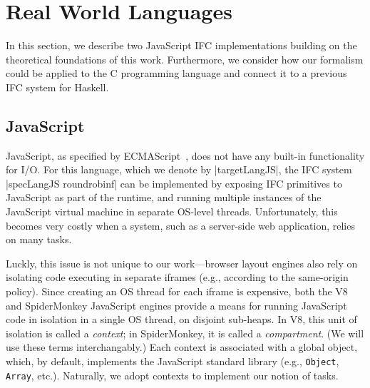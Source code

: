 \section{Real World Languages}
\label{sec:real}

In this section, we describe two JavaScript IFC implementations
building on the theoretical foundations of this work.
%
Furthermore, we consider how our formalism could be applied to the C
programming language
and connect it to a previous IFC system for
Haskell.
%
%


\subsection{JavaScript}
\label{sec:real:js}

JavaScript, as specified by
ECMAScript~\cite{ecma}, does not have any built-in
functionality for I/O.
%
For this language, which we denote by |targetLangJS|, the IFC system
|specLangJS roundrobinf| can be implemented by exposing IFC primitives
to JavaScript as part of the runtime, and running multiple instances
of the JavaScript virtual machine in separate OS-level threads.
%
Unfortunately, this becomes very costly when a system, such as a
server-side web application, relies on many tasks.
%

Luckly, this issue is not unique to our work---browser layout engines
also rely on isolating code executing in separate iframes (e.g., according to the
same-origin policy).
%
Since creating an OS thread for each iframe is expensive, both
the V8 and SpiderMonkey JavaScript engines provide a means for running
JavaScript code in isolation in a single OS thread,
on disjoint sub-heaps.
%
In V8, this unit of isolation is called a \emph{context}; in
SpiderMonkey, it is called a \emph{compartment}.
%
(We will use these terms interchangably.)
%
Each context is associated with a global object, which, by
default, implements the JavaScript standard library (e.g.,
\verb|Object|, \verb|Array|, etc.).
%
Naturally, we adopt contexts to implement our notion of tasks.


